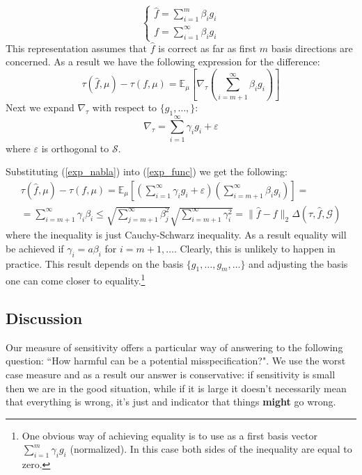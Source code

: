 \documentclass[12pt]{article}
\theoremstyle{plain}
\begin{document}
\begin{equation}
\begin{cases}
\hat f = \sum_{i=1}^m\beta_i g_i\\
f = \sum_{i=1}^\infty \beta_i g_i 
\end{cases}
\end{equation}
This representation assumes that $\hat f$ is correct as far as first $m$ basis directions are concerned. As a result we have the following expression for the difference:
\begin{equation}\label{exp_func}
\tau(\hat f,\mu)-\tau(f,\mu)  = \mathbb{E}_{\mu}\left[\nabla_{\tau}\left(\sum_{i=m+1}^\infty \beta_i g_i\right)\right]
\end{equation}
Next we expand $\nabla_{\tau}$ with respect to $\{g_1,\dots,\}$:
\begin{equation}\label{exp_nabla}
\nabla_{\tau}= \sum_{i=1}^{\infty}\gamma_i g_i +\varepsilon
\end{equation}
where $\varepsilon$ is orthogonal to $\mathcal{S}$.

Substituting (\ref{exp_nabla}) into  (\ref{exp_func}) we get the following:
\begin{multline}
\tau(\hat f,\mu)-\tau(f,\mu)  =  \mathbb{E}_{\mu}\left[\left(\sum_{i=1}^{\infty}\gamma_i g_i +\varepsilon\right)\left(\sum_{i=m+1}^\infty \beta_i g_i\right)\right]= \\
=\sum_{i=m+1}^{\infty}\gamma_i\beta_i\le  \sqrt{\sum_{j=m+1}^{\infty}\beta_j^2}\sqrt{\sum_{i=m+1}^{\infty}\gamma_i^2} = \|\hat f - f\|_2 \Delta(\tau,\hat f, \mathcal{G})
\end{multline}
where the inequality is just Cauchy-Schwarz inequality. As a result equality will be achieved if $\gamma_i = a \beta_i$ for $i=m+1,\dots$. Clearly, this is unlikely to happen in practice. This result  depends on the basis $\{g_1,\dots, g_m,\dots\}$ and adjusting the basis one can come closer to equality.\footnote{One obvious way of achieving equality is to use as a first basis vector $\sum_{i=1}^m \gamma_i g_i$ (normalized). In this case both sides of the inequality are equal to zero.} 



\subsection{Discussion}

Our measure of sensitivity offers a particular way of answering to the following question: ``How harmful can be a potential misspecification?".  We use the worst case measure and as a result our answer is conservative: if sensitivity is small then we are in the good situation, while if it is large it doesn't necessarily mean that everything is wrong, it's just and indicator that things \textbf{might} go wrong.  
\end{document}
